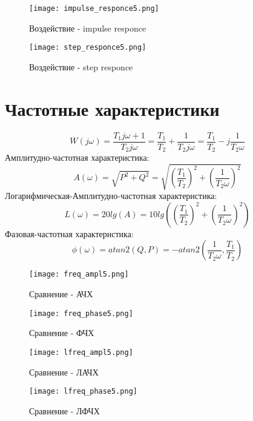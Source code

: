 \begin{figure}[ht]
  \centering
  \texttt{[image: impulse\_responce5.png]}
  \caption{Воздействие - \textrm{impulse responce}}
\end{figure}
\newpage
\begin{figure}[ht]
    \centering
    \texttt{[image: step\_responce5.png]}
    \caption{Воздействие - \textrm{step responce}}
  \end{figure}
\newpage

\section{Частотные характеристики}
$$
W(j\omega) =  \frac{T_1 j\omega + 1}{T_2 j \omega} = \frac{T_1}{T_2} + \frac{1}{T_2j\omega} = \frac{T_1}{T_2} - j\frac{1}{T_2\omega}
$$
Амплитудно-частотная характеристика:
$$
A(\omega) = \sqrt{P^2 + Q^2} = \sqrt{(\frac{T_1}{T_2})^2 + (\frac{1}{T_2\omega})^2}
$$
Логарифмическая-Амплитудно-частотная характеристика:
$$
L(\omega) = 20lg(A) = 10lg( (\frac{T_1}{T_2})^2 + (\frac{1}{T_2\omega})^2 )
$$
Фазовая-частотная характеристика:
$$
\phi(\omega) = atan2(Q,P) = -atan2(\frac{1}{T_2\omega} , \frac{T_1}{T_2})
$$
\newpage
\begin{figure}[ht]
  \centering
  \texttt{[image: freq\_ampl5.png]}
\caption{Сравнение - АЧХ}
\end{figure}

\begin{figure}[ht]
    \centering
    \texttt{[image: freq\_phase5.png]}
  \caption{Сравнение - ФЧХ}
  \end{figure}
\newpage
\begin{figure}[ht]
    \centering
    \texttt{[image: lfreq\_ampl5.png]}
  \caption{Сравнение - ЛАЧХ}
  \end{figure}
  
  \begin{figure}[ht]
      \centering
      \texttt{[image: lfreq\_phase5.png]}
    \caption{Сравнение - ЛФЧХ}
    \end{figure}

\newpage

\endinput